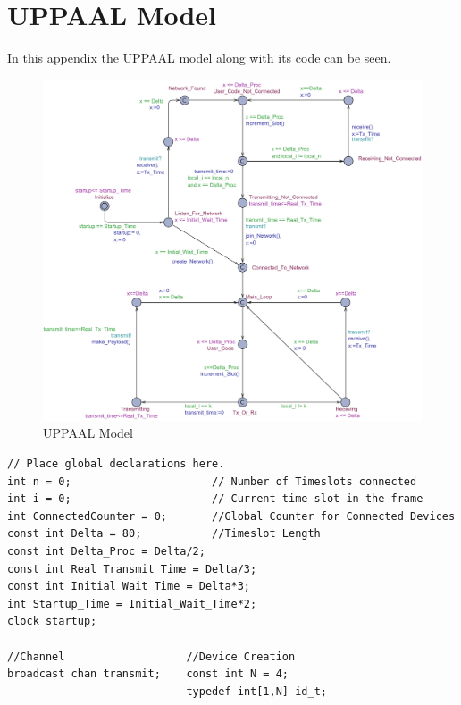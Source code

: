 \chapter{UPPAAL Model}\label{app:UPPAAL}
In this appendix the UPPAAL model along with its code can be seen.

\begin{figure}
	\hspace{-100pt}
  \includegraphics[width=1.4\textwidth]{Figures/Model/Device.pdf} 
\caption{UPPAAL Model}
\end{figure}

\begin{lstlisting}[language={[GUI]Uppaal}, % use GUI flavor
columns={[l]flexible},
frameround=fftt, frame=shadowbox, rulesepcolor=\color{gray},
caption={Code for the global declarations.}]
// Place global declarations here.
int n = 0;                      // Number of Timeslots connected
int i = 0;                      // Current time slot in the frame
int ConnectedCounter = 0;       //Global Counter for Connected Devices
const int Delta = 80;           //Timeslot Length
const int Delta_Proc = Delta/2;
const int Real_Transmit_Time = Delta/3;
const int Initial_Wait_Time = Delta*3;
int Startup_Time = Initial_Wait_Time*2;
clock startup;

//Channel					//Device Creation
broadcast chan transmit;	const int N = 4;
							typedef int[1,N] id_t;
\end{lstlisting}


